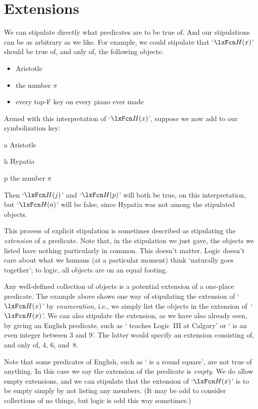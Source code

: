 \section{Extensions}\label{sec:extensions}
We can stipulate directly what predicates are to be true of. And our stipulations can be as arbitrary as we like. For example, we could stipulate that `$\atom{H}{x}$' should be true of, and only of, the following objects:
	\begin{itemize}
		\item Aristotle
		\item the number $\pi$
		\item every top-F key on every piano ever made
	\end{itemize}
Armed with this interpretation of `$\atom{H}{x}$', suppose we now add to our symbolization key:
	\begin{ekey}
		\item[a] Aristotle
		\item[h] Hypatia
		\item[p] the number $\pi$
	\end{ekey}
Then `$\atom{H}{j}$' and `$\atom{H}{p}$' will both be true, on this interpretation, but `$\atom{H}{a}$' will be false, since Hypatia was not among the stipulated objects.

This process of explicit stipulation is sometimes described as stipulating the \emph{extension} of a predicate. Note that, in the stipulation we just gave, the objects we listed have nothing particularly in common. This doesn't matter. Logic doesn't care about what we humans (at a particular moment) think `naturally goes together'; to logic, all objects are on an equal footing.

Any well-defined collection of objects is a potential extension of a one-place predicate.  The example above shows one way of stipulating the extension of `$\atom{H}{x}$' by \emph{enumeration}, i.e., we simply list the objects in the extension of~`$\atom{H}{x}$'. We can also stipulate the extension, as we have also already seen, by giving an English predicate, such as ` teaches Logic~III at Calgary' or ` is an even integer between $3$ and $9$'. The latter would specify an extension consisting of, and only of, $4$, $6$, and~$8$.

Note that some predicates of English, such as ` is a round square', are not true of anything.  In this case we say the extension of the predicate is \emph{empty}.  We do allow empty extensions, and we can stipulate that the extension of `$\atom{H}{x}$' is to be empty simply by not listing any members. (It may be odd to consider collections of no things, but logic is odd this way sometimes.)


